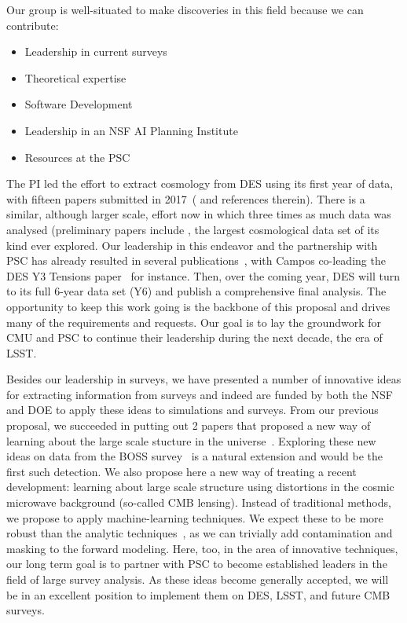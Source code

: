 \documentclass[12pt]{article}
\begin{document}
\begin{small}
Our group is well-situated to make discoveries in this field because we can contribute:
\begin{itemize}
\item Leadership in current surveys
\item Theoretical expertise
\item Software Development
\item Leadership in an NSF AI Planning Institute
\item Resources at the PSC
\end{itemize} 
The PI led the effort to extract cosmology from DES using its first year of data, with fifteen papers submitted in 2017~(\cite{Abbott:2017wau} and references therein). There is a similar, although larger scale, effort now in which three times as much data was analysed (preliminary papers include , the largest cosmological data set of its kind ever explored. Our leadership in this endeavor and the partnership with PSC has already resulted in several publications~\cite{Hartley:2020euq,Lemos:2020jry,MacCrann:2020yhw,Friedrich:2020dqo,Myles:2020dyq}, with Campos co-leading the DES Y3 Tensions paper~\cite{y3-tensions} for instance. Then, over the coming year, DES will turn to its full 6-year data set (Y6) and publish a comprehensive final analysis. The opportunity to keep this work going is the backbone of this proposal and drives many of the requirements and requests. %
Our goal is to lay the groundwork for CMU and PSC to continue their leadership during the next decade, the era of LSST.

Besides our leadership in surveys, we have presented a number of innovative ideas for extracting information from surveys and indeed are funded by both the NSF and DOE to apply these ideas to simulations and surveys. From our previous proposal, we succeeded in putting out 2 papers that proposed a new way of learning about the large scale stucture in the universe~\cite{Li:2020uug,Li:2020luq}.
Exploring these new ideas on data from the BOSS survey~\cite{Neveux:2020voa} is a natural extension and would be the first such detection. We also propose here a new way of treating a recent development: learning about large scale structure using distortions in the cosmic microwave background (so-called CMB lensing). Instead of traditional methods, we propose to apply machine-learning techniques. We expect these to be more robust than the analytic techniques~\cite{Hu:2001tn,Hu:2001kj}, as we can trivially add contamination and masking to the forward modeling. Here, too, in the area of innovative techniques, our long term goal is to partner with PSC to become established leaders in the field of large survey analysis. As these ideas become generally accepted, we will be in an excellent position to implement them on DES, LSST, and future CMB surveys.


\end{small}
\end{document}
